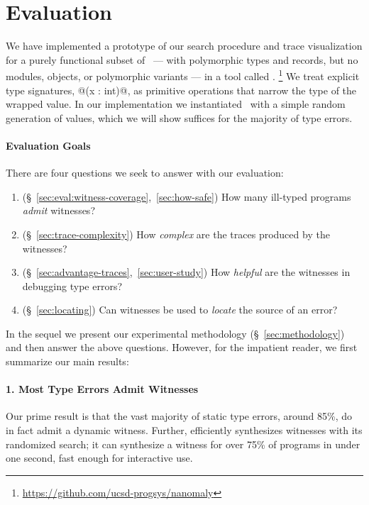 \section{Evaluation}
\label{sec:evaluation}

We have implemented a prototype of our search procedure and trace
visualization for a purely functional subset of \ocaml\ --- with
polymorphic types and records, but no modules, objects, or polymorphic
variants --- in a tool called \nanomaly.
\footnote{\url{https://github.com/ucsd-progsys/nanomaly}}
%
We treat explicit type signatures, \eg @(x : int)@, as
primitive operations that narrow the type of the wrapped value.
%
In our implementation we instantiated \gensym\ with a simple random
generation of values, which we will show suffices for the majority of
type errors.

\paragraph{Evaluation Goals}
%
There are four questions we seek to answer with our evaluation:
%
\begin{enumerate}
\item {} (\S~\ref{sec:eval:witness-coverage},~\ref{sec:how-safe})
      How many ill-typed programs \emph{admit} witnesses?
\item {} (\S~\ref{sec:trace-complexity})
      How \emph{complex} are the traces produced by the witnesses?
\item {} (\S~\ref{sec:advantage-traces},~\ref{sec:user-study})
      How \emph{helpful} %
      are the witnesses in debugging type errors?
\item {} (\S~\ref{sec:locating})
      Can witnesses be used to \emph{locate} the source
      of an error?
\end{enumerate}

In the sequel we present our experimental methodology (\S~\ref{sec:methodology})
and then answer the above questions.
%
However, for the impatient reader, we first summarize our main results:

\paragraph{1. Most Type Errors Admit Witnesses}
Our prime result is that the vast majority of static type errors, around
85\%, do in fact admit a dynamic witness.
%
Further, \toolname efficiently synthesizes witnesses with its randomized search;
it can synthesize a witness for over 75\% of programs in under one second, \ie
fast enough for interactive use. %
%

